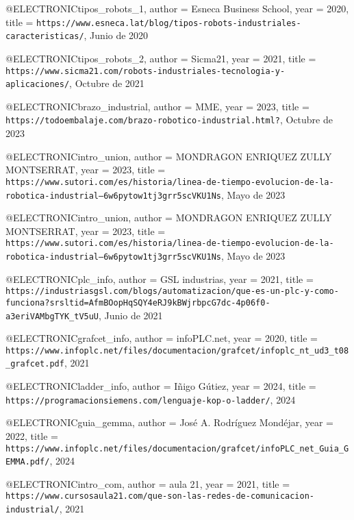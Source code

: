 @ELECTRONIC{tipos_robots_1,
  author = {{Esneca Business School}},
  year = {2020},
  title = {\texttt{https://www.esneca.lat/blog/tipos-robots-industriales-caracteristicas/}, {J}unio de 2020}
}

@ELECTRONIC{tipos_robots_2,
  author = {{Sicma21}},
  year = {2021},
  title = {\texttt{https://www.sicma21.com/robots-industriales-tecnologia-y-aplicaciones/}, {O}ctubre de 2021}
}

@ELECTRONIC{brazo_industrial,
  author = {{MME}},
  year = {2023},
  title = {\texttt{https://todoembalaje.com/brazo-robotico-industrial.html?}, {O}ctubre de 2023}
}

@ELECTRONIC{intro_union,
  author = {{MONDRAGON ENRIQUEZ ZULLY MONTSERRAT}},
  year = {2023},
  title = {\texttt{https://www.sutori.com/es/historia/linea-de-tiempo-evolucion-de-la-robotica-industrial--6w6pytow1tj3grr5scVKU1Ns}, {M}ayo de 2023}
}

@ELECTRONIC{intro_union,
  author = {{MONDRAGON ENRIQUEZ ZULLY MONTSERRAT}},
  year = {2023},
  title = {\texttt{https://www.sutori.com/es/historia/linea-de-tiempo-evolucion-de-la-robotica-industrial--6w6pytow1tj3grr5scVKU1Ns}, {M}ayo de 2023}
}

@ELECTRONIC{plc_info,
  author = {{GSL industrias}},
  year = {2021},
  title = {\texttt{https://industriasgsl.com/blogs/automatizacion/que-es-un-plc-y-como-funciona?srsltid=AfmBOopHqSQY4eRJ9kBWjrbpcG7dc-4p06f0-a3eriVAMbgTYK_tV5uU}, {J}unio de 2021}
}

@ELECTRONIC{grafcet_info,
  author = {{infoPLC.net}},
  year = {2020},
  title = {\texttt{https://www.infoplc.net/files/documentacion/grafcet/infoplc_nt_ud3_t08_grafcet.pdf}, 2021}
}

@ELECTRONIC{ladder_info,
  author = {{Iñigo Gútiez}},
  year = {2024},
  title = {\texttt{https://programacionsiemens.com/lenguaje-kop-o-ladder/}, 2024}
}

@ELECTRONIC{guia_gemma,
  author = {{José A. Rodríguez Mondéjar}},
  year = {2022},
  title = {\texttt{https://www.infoplc.net/files/documentacion/grafcet/infoPLC_net_Guia_GEMMA.pdf/}, 2024}
}

@ELECTRONIC{intro_com,
  author = {{aula 21}},
  year = {2021},
  title = {\texttt{https://www.cursosaula21.com/que-son-las-redes-de-comunicacion-industrial/}, 2021}
}